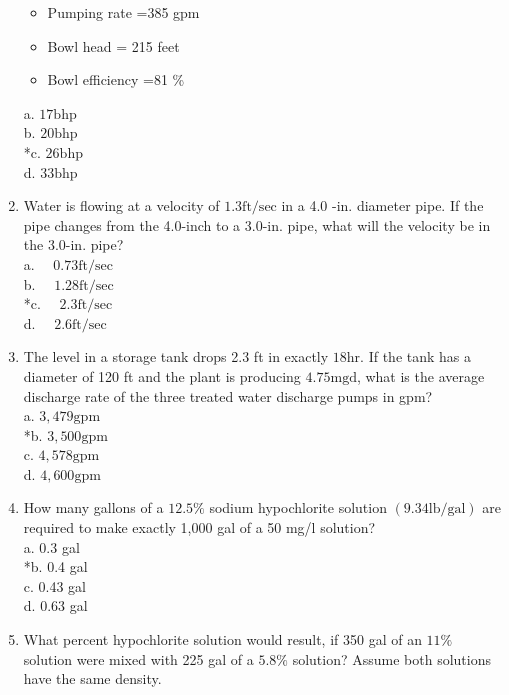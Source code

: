 \begin{enumerate}
\begin{itemize}
\item Pumping rate =385 gpm\\
\item Bowl head = 215 feet\\
\item Bowl efficiency =81 \%\\
  \end{itemize}
a. $17 \mathrm{bhp}$\\
b. $20 \mathrm{bhp}$\\
*c. $26 \mathrm{bhp}$\\
d. $33 \mathrm{bhp}$\\
\item Water is flowing at a velocity of $1.3 \mathrm{ft} / \mathrm{sec}$ in a 4.0 -in. diameter pipe. If the pipe changes from the 4.0-inch to a 3.0-in. pipe, what will the velocity be in the 3.0-in. pipe?\\
a. $\quad 0.73 \mathrm{ft} / \mathrm{sec}$\\
b. $\quad 1.28 \mathrm{ft} / \mathrm{sec}$\\
*c. $\quad 2.3 \mathrm{ft} / \mathrm{sec}$\\
d. $\quad 2.6 \mathrm{ft} / \mathrm{sec}$\\
\item The level in a storage tank drops 2.3 ft in exactly $18 \mathrm{hr}$. If the tank has a diameter of 120 ft and the plant is producing $4.75 \mathrm{mgd}$, what is the average discharge rate of the three treated water discharge pumps in gpm?\\
a. $3,479 \mathrm{gpm}$\\
*b. $3,500 \mathrm{gpm}$\\
c. $4,578 \mathrm{gpm}$\\
d. $4,600 \mathrm{gpm}$\\
\item How many gallons of a $12.5 \%$ sodium hypochlorite solution $(9.34 \mathrm{lb} / \mathrm{gal})$ are required to make exactly 1,000 gal of a 50 mg/l solution?\\
a. 0.3 gal\\
*b. 0.4 gal\\
c. 0.43 gal\\
d. 0.63 gal\\
\item What percent hypochlorite solution would result, if 350 gal of an $11 \%$ solution were mixed with 225 gal of a $5.8 \%$ solution? Assume both solutions have the same density.\\

\end{enumerate}
